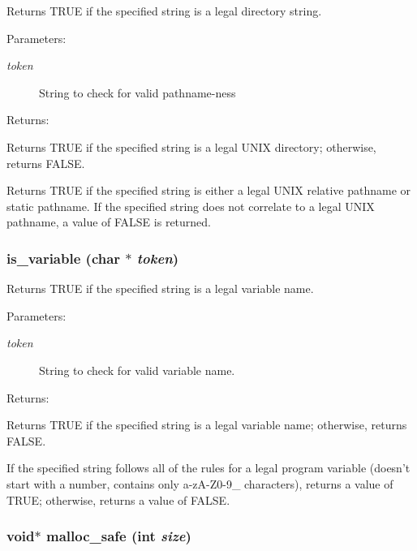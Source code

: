 Returns TRUE if the specified string is a legal directory string.

\begin{Desc}
\item[Parameters: ]\par
\begin{description}
\item[{\em 
token}]String to check for valid pathname-ness \end{description}
\end{Desc}
\begin{Desc}
\item[Returns: ]\par
Returns TRUE if the specified string is a legal UNIX directory; otherwise, returns FALSE.\end{Desc}
Returns TRUE if the specified string is either a legal UNIX relative pathname or static pathname. If the specified string does not correlate to a legal UNIX pathname, a value of FALSE is returned. 
\subsubsection{ is\_\-variable (char $\ast$ {\em token})}\label{util_8h_a2}


Returns TRUE if the specified string is a legal variable name.

\begin{Desc}
\item[Parameters: ]\par
\begin{description}
\item[{\em 
token}]String to check for valid variable name. \end{description}
\end{Desc}
\begin{Desc}
\item[Returns: ]\par
Returns TRUE if the specified string is a legal variable name; otherwise, returns FALSE.\end{Desc}
If the specified string follows all of the rules for a legal program variable (doesn't start with a number, contains only a-z\-A-Z0-9\_\- characters), returns a value of TRUE; otherwise, returns a value of FALSE. 
\subsubsection{\setlength{\rightskip}{0pt plus 5cm}void$\ast$ malloc\_\-safe (int {\em size})}\label{util_8h_a11}


